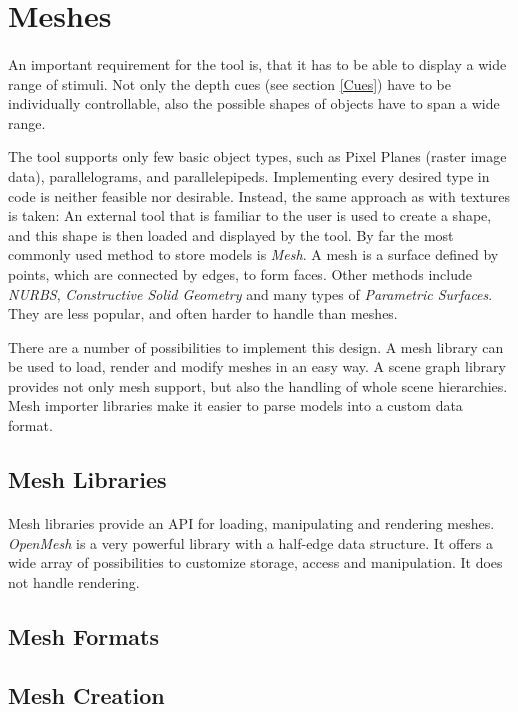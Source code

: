 \section{Meshes}
\paragraph{}
An important requirement for the tool is, that it has to be able to display a wide range of stimuli. Not only the depth cues (see section \ref{Cues}) have to be individually controllable, also the possible shapes of objects have to span a wide range.

The tool supports only few basic object types, such as Pixel Planes (raster image data), parallelograms, and parallelepipeds. Implementing every desired type in code is neither feasible nor desirable.
Instead, the same approach as with textures is taken: An external tool that is familiar to the user is used to create a shape, and this shape is then loaded and displayed by the tool. By far the most commonly used method to store models is \textit{Mesh}. A mesh is a surface defined by points, which are connected by edges, to form faces. Other methods include \textit{NURBS}, \textit{Constructive Solid Geometry} and many types of \textit{Parametric Surfaces}. They are less popular, and often harder to handle than meshes.

There are a number of possibilities to implement this design. A mesh library can be used to load, render and modify meshes in an easy way. A scene graph library provides not only mesh support, but also the handling of whole scene hierarchies. Mesh importer libraries make it easier to parse models into a custom data format.


\subsection{Mesh Libraries}
\paragraph{}
Mesh libraries provide an API for loading, manipulating and rendering meshes. \textit{OpenMesh} is a very powerful library with a half-edge data structure. It offers a wide array of possibilities to customize storage, access and manipulation. It does not handle rendering.

\paragraph{}


\subsection{Mesh Formats}
\paragraph{}

\subsection{Mesh Creation}
\paragraph{}
